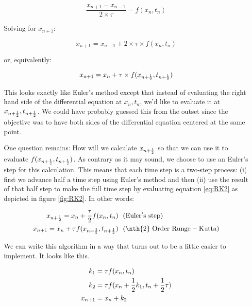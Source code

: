 \begin{equation}\label{eq:finiteVersionCentered}
\frac{x_{n+1} - x_{n-1}}{2 \times \tau} = f(x_n,t_n)
\end{equation}

Solving for $x_{n+1}$:

\begin{equation}
x_{n+1} = x_{n-1}  + 2 \times \tau\times  f(x_n,t_n) 
\end{equation}

or, equivalently:

\begin{equation} \label{eq:RK2}
x_{n+1} = x_n + \tau\times  f(x_{n + {1\over 2}},t_{n + {1\over 2}}) 
\end{equation}

This looks exactly like Euler's method except that instead of
evaluating the right hand side of the differential equation at
$x_n,t_n$, we'd like to evaluate it at $x_{n + {1\over 2}}, t_{n +
  {1\over 2}}$.  We could have probably guessed this from the outset
since the objective was to have both sides of the differential
equation centered at the same point.  

One question remains:  How will we calculate $x_{n + {1\over 2}}$ so
that we can use it to evaluate $f(x_{n + {1\over 2}},t_{n + {1\over 2}})$.
As contrary as it may sound, we choose to use an Euler's step for this calculation.  This means that
each time step is a two-step process:  (i) first we advance half a time
step using Euler's method and then (ii) use the result of that half
step to make the full time step by evaluating equation \eqref{eq:RK2} as depicted in
figure \ref{fig:RK2}.  In other words:

\begin{align}\label{RK2:methodOne}
x_{n + {1\over 2}} = x_n + {\tau\over 2} f(x_n,t_n)& ~~\mathrm{(Euler's~ step)}\\
x_{n + 1} = x_n + \tau f(x_{n + {1\over 2}},t_{n + {1\over 2}})&
~~\mathrm{(\nth{2} ~Order~ Runge-Kutta)}
\end{align}

We can write this algorithm in a way that turns out to be a little
easier to implement.  It looks like this.  

\begin{align}\label{RK2:methodTwo}
k_1 &= \tau f(x_n,t_n)\\
k_2 &= \tau f(x_n + {1\over 2} k_1,t_n + {1\over 2} \tau)\\
x_{n + 1} &= x_n + k_2
\end{align}

